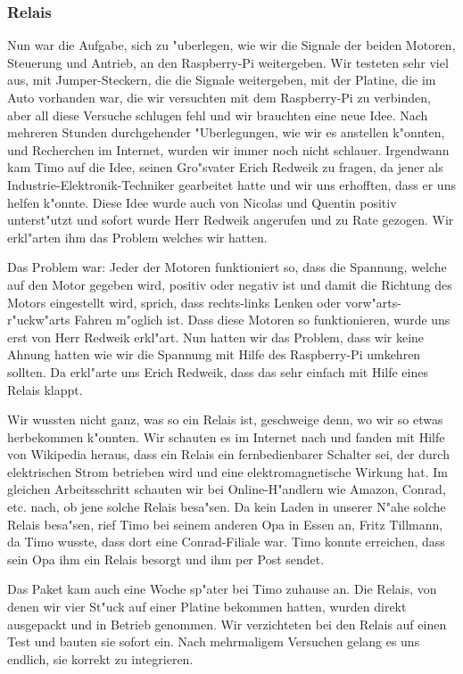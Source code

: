 \documentclass[a4paper,12pt]{article}
\begin{document}
\subsubsection{Relais}\label{sec2.1.4}

Nun war die Aufgabe, sich zu "uberlegen, wie wir die Signale der beiden Motoren, Steuerung und Antrieb, an den Raspberry-Pi weitergeben.
Wir testeten sehr viel aus, mit Jumper-Steckern, die die Signale weitergeben, mit der Platine, die im Auto vorhanden war, die wir versuchten mit dem Raspberry-Pi zu verbinden, aber all diese Versuche schlugen fehl und wir brauchten eine neue Idee.
Nach mehreren Stunden durchgehender "Uberlegungen, wie wir es anstellen k"onnten, und Recherchen im Internet, wurden wir immer noch nicht schlauer.
Irgendwann kam Timo auf die Idee, seinen Gro"svater Erich Redweik zu fragen, da jener als Industrie-Elektronik-Techniker gearbeitet hatte und wir uns erhofften, dass er uns helfen k"onnte.
Diese Idee wurde auch von Nicolas und Quentin positiv unterst"utzt und sofort wurde Herr Redweik angerufen und zu Rate gezogen.
Wir erkl"arten ihm das Problem welches wir hatten.

Das Problem war: Jeder der Motoren funktioniert so, dass die Spannung, welche auf den Motor gegeben wird, positiv oder negativ ist und damit die Richtung des Motors eingestellt wird, sprich, dass rechts-links Lenken oder vorw"arts-r"uckw"arts Fahren m"oglich ist.
Dass diese Motoren so funktionieren, wurde uns erst von Herr Redweik erkl"art.
Nun hatten wir das Problem, dass wir keine Ahnung hatten wie wir die Spannung mit Hilfe des Raspberry-Pi umkehren sollten.
Da erkl"arte uns Erich Redweik, dass das sehr einfach mit Hilfe eines Relais klappt.

Wir wussten nicht ganz, was so ein Relais ist, geschweige denn, wo wir so etwas herbekommen k"onnten.
Wir schauten es im Internet nach und fanden mit Hilfe von Wikipedia heraus, dass ein Relais ein fernbedienbarer Schalter sei, der durch elektrischen Strom betrieben wird und eine elektromagnetische Wirkung hat.
Im gleichen Arbeitsschritt schauten wir bei Online-H"andlern wie Amazon, Conrad, etc. nach, ob jene solche Relais besa"sen.
Da kein Laden in unserer N"ahe solche Relais besa"sen, rief Timo bei seinem anderen Opa in Essen an, Fritz Tillmann, da Timo wusste, dass dort eine Conrad-Filiale war.
Timo konnte erreichen, dass sein Opa ihm ein Relais besorgt und ihm per Post sendet.

Das Paket kam auch eine Woche sp"ater bei Timo zuhause an.
Die Relais, von denen wir vier St"uck auf einer Platine bekommen hatten, wurden direkt ausgepackt und in Betrieb genommen.
Wir verzichteten bei den Relais auf einen Test und bauten sie sofort ein.
Nach mehrmaligem Versuchen gelang es uns endlich, sie korrekt zu integrieren.
\end{document}
